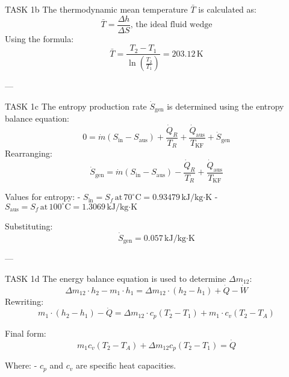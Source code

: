 TASK 1b  
The thermodynamic mean temperature \( \bar{T} \) is calculated as:  
\[
\bar{T} = \frac{\Delta h}{\Delta S}, \, \text{the ideal fluid wedge}
\]  
Using the formula:  
\[
\bar{T} = \frac{T_2 - T_1}{\ln\left(\frac{T_2}{T_1}\right)} = 203.12 \, \text{K}
\]  

---

TASK 1c  
The entropy production rate \( \dot{S}_{\text{gen}} \) is determined using the entropy balance equation:  
\[
0 = \dot{m} \left(S_{\text{in}} - S_{\text{aus}}\right) + \frac{\dot{Q}_R}{T_R} + \frac{\dot{Q}_{\text{aus}}}{T_{\text{KF}}} + \dot{S}_{\text{gen}}
\]  
Rearranging:  
\[
\dot{S}_{\text{gen}} = \dot{m} \left(S_{\text{in}} - S_{\text{aus}}\right) - \frac{\dot{Q}_R}{T_R} + \frac{\dot{Q}_{\text{aus}}}{T_{\text{KF}}}
\]  

Values for entropy:  
- \( S_{\text{in}} = S_f \, \text{at} \, 70^\circ\text{C} = 0.93479 \, \text{kJ/kg·K} \)  
- \( S_{\text{aus}} = S_f \, \text{at} \, 100^\circ\text{C} = 1.3069 \, \text{kJ/kg·K} \)  

Substituting:  
\[
\dot{S}_{\text{gen}} = 0.057 \, \text{kJ/kg·K}
\]  

---

TASK 1d  
The energy balance equation is used to determine \( \Delta m_{12} \):  
\[
\Delta m_{12} \cdot h_2 - m_1 \cdot h_1 = \Delta m_{12} \cdot (h_2 - h_1) + \dot{Q} - \dot{W}
\]  
Rewriting:  
\[
m_1 \cdot (h_2 - h_1) - \dot{Q} = \Delta m_{12} \cdot c_p (T_2 - T_1) + m_1 \cdot c_v (T_2 - T_A)
\]  

Final form:  
\[
m_1 c_v (T_2 - T_A) + \Delta m_{12} c_p (T_2 - T_1) = \dot{Q}
\]  

Where:  
- \( c_p \) and \( c_v \) are specific heat capacities.  
